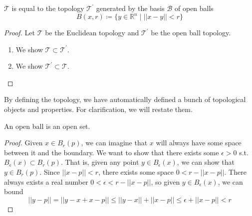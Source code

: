   \begin{theorem}
    $\mathscr{T}$ is equal to the topology $\mathscr{T}^\prime$ generated by the basis $\mathscr{B}$ of open balls 
    \begin{equation} 
      B(x, r) \coloneqq \{ y \in \mathbb{R}^n \mid ||x - y|| < r\}
    \end{equation}
  \end{theorem} 
  \begin{proof}
    Let $\mathscr{T}$ be the Euclidean topology and $\mathscr{T}^\prime$ be the open ball topology. 
    \begin{enumerate}
      \item We show $\mathscr{T} \subset \mathscr{T}^\prime$. 
      \item We show $\mathscr{T}^\prime \subset \mathscr{T}$. 
    \end{enumerate}
  \end{proof} 

  By defining the topology, we have automatically defined a bunch of topological objects and properties. For clarification, we will restate them. 
  
  \begin{corollary}
    An open ball is an open set. 
  \end{corollary}
  \begin{proof}
    Given $x \in B_r (p)$, we can imagine that $x$ will always have some space between it and the boundary. We want to show that there exists some $\epsilon >0$ s.t. $B_\epsilon (x) \subset B_r (p)$. That is, given any point $y \in B_\epsilon (x)$, we can show that $y \in B_r (p)$. Since $||x - p|| < r$, there exists some space $0 < r - ||x - p||$. There always exists a real number $0 < \epsilon < r - ||x - p||$, so given $y \in B_\epsilon (x)$, we can bound
    \begin{equation}
      ||y - p|| = ||y - x + x - p|| \leq ||y - x|| + ||x - p|| \leq \epsilon + ||x - p|| < r
    \end{equation}
  \end{proof}

